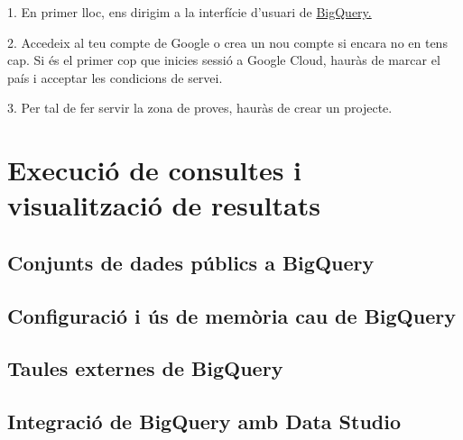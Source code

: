 \documentclass[12pt,longbibliography]{article}
\theoremstyle{definition}
\theoremstyle{remark}
\begin{document}
1. En primer lloc, ens dirigim a la interfície d’usuari de \href{https://console.cloud.google.com}{BigQuery.}

2. Accedeix al teu compte de Google o crea un nou compte si encara no en tens cap. Si és el primer cop que inicies sessió a Google Cloud, hauràs de marcar el país i acceptar les condicions de servei.

3. Per tal de fer servir la zona de proves, hauràs de crear un projecte.

\newpage

\section{Execució de consultes i visualització de resultats}

\subsection{Conjunts de dades públics a BigQuery}

\subsection{Configuració i ús de memòria cau de BigQuery}

\subsection{Taules externes de BigQuery}

\subsection{Integració de BigQuery amb Data Studio}

\newpage
\end{document}
